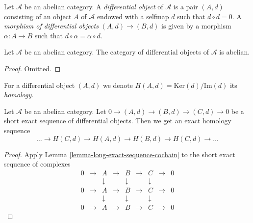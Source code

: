 \begin{definition}
\label{definition-differential-object}
Let $\mathcal{A}$ be an abelian category.
A {\it differential object} of $\mathcal{A}$
is a pair $(A, d)$ consisting of an
object $A$ of $\mathcal{A}$
endowed with a selfmap $d$ such that $d \circ d = 0$.
A {\it morphism of differential objects} $(A, d) \to (B, d)$
is given by a morphism $\alpha : A \to B$ such that
$d \circ \alpha = \alpha \circ d$.
\end{definition}

\begin{lemma}
\label{lemma-differential-objects-abelian}
Let $\mathcal{A}$ be an abelian category.
The category of differential objects of $\mathcal{A}$ is abelian.
\end{lemma}

\begin{proof}
Omitted.
\end{proof}

\begin{definition}
\label{definition-differential-object-homology}
For a differential object $(A, d)$ we denote
$H(A, d) = \text{Ker}(d)/\text{Im}(d)$ its {\it homology}.
\end{definition}

\begin{lemma}
\label{lemma-differential-objects-ses}
Let $\mathcal{A}$ be an abelian category.
Let $0 \to (A, d) \to (B, d) \to (C, d) \to 0$ be a short exact sequence
of differential objects. Then we get an exact homology sequence
$$
\ldots \to H(C, d) \to H(A, d) \to H(B, d) \to H(C, d) \to \ldots
$$
\end{lemma}

\begin{proof}
Apply Lemma \ref{lemma-long-exact-sequence-cochain}
to the short exact sequence of complexes
$$
\begin{matrix}
0 & \to & A & \to & B & \to & C & \to & 0 \\
& & \downarrow & & \downarrow & & \downarrow \\
0 & \to & A & \to & B & \to & C & \to & 0 \\
& & \downarrow & & \downarrow & & \downarrow \\
0 & \to & A & \to & B & \to & C & \to & 0
\end{matrix}
$$
\end{proof}

